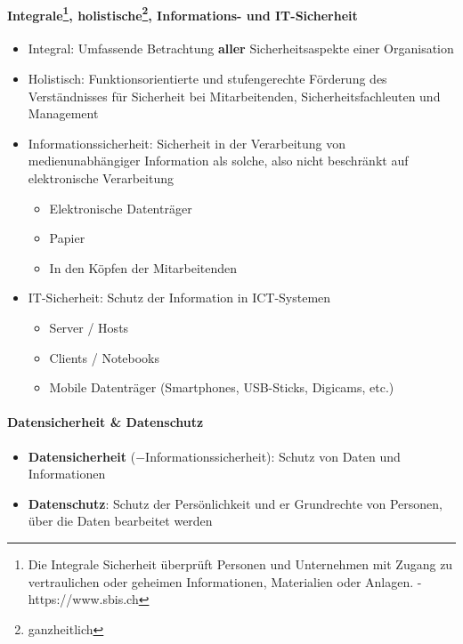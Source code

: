 \documentclass[10pt,a4paper]{article}
\begin{document}
\paragraph*{Integrale\footnote{Die Integrale Sicherheit überprüft Personen und Unternehmen mit Zugang zu vertraulichen oder geheimen Informationen, Materialien oder Anlagen. - https://www.sbis.ch}, holistische\footnote{ganzheitlich}, Informations- und IT-Sicherheit}
\begin{itemize}[noitemsep,topsep=0pt,leftmargin=*]
    \item Integral: Umfassende Betrachtung \textbf{aller} Sicherheitsaspekte einer Organisation
    \item Holistisch: Funktionsorientierte und stufengerechte Förderung des Verständnisses für Sicherheit bei Mitarbeitenden, Sicherheitsfachleuten und Management
    \item Informationssicherheit: Sicherheit in der Verarbeitung von medienunabhängiger Information als solche, also nicht beschränkt auf elektronische Verarbeitung
    \begin{itemize}[noitemsep,topsep=0pt,leftmargin=*]
        \item Elektronische Datenträger
        \item Papier
        \item In den Köpfen der Mitarbeitenden
    \end{itemize}
    \item IT-Sicherheit: Schutz der Information in ICT-Systemen
    \begin{itemize}[noitemsep,topsep=0pt,leftmargin=*]
        \item Server / Hosts
        \item Clients / Notebooks
        \item Mobile Datenträger (Smartphones, USB-Sticks, Digicams, etc.)
    \end{itemize}
\end{itemize}

\paragraph*{Datensicherheit \& Datenschutz}\label{para:DatensicherheitDatenschutz}
\begin{itemize}[noitemsep,topsep=0pt,leftmargin=*]
    \item \textbf{Datensicherheit} ($-$Informationssicherheit): Schutz von Daten und Informationen
    \item \textbf{Datenschutz}: Schutz der Persönlichkeit und er Grundrechte von Personen, über die Daten bearbeitet werden
\end{itemize}
\end{document}
